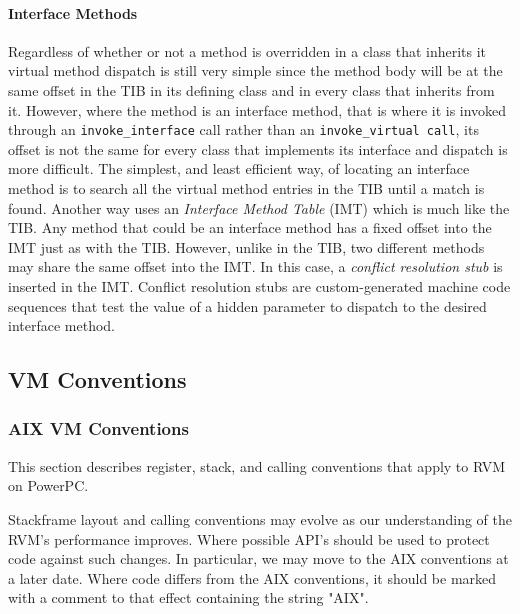 \paragraph{Interface Methods}
Regardless of whether or not a method is overridden in a class that inherits it
virtual method dispatch is still very simple since the method body will be at
the same offset in the TIB in its defining class and in every class that 
inherits from it. 
However, where the method is an interface method, 
that is where it is invoked through an {\tt invoke\_interface} call rather than
an {\tt invoke\_virtual call}, its offset is not the same for every class that 
implements its interface and dispatch is more difficult.
The simplest, and least efficient way, of locating an interface method 
is to search all the virtual method entries in the TIB until a match is found.
Another way uses an {\em Interface Method Table} (IMT) which is much like the 
TIB. Any method that could be an interface method has a fixed offset into the 
IMT just as with the TIB. However, unlike in the TIB, two different methods may
share the same offset into the IMT. In this case, a {\em conflict resolution
stub} is inserted in the IMT. Conflict resolution stubs are
custom-generated machine code sequences that test the value of a
hidden parameter to dispatch to the desired interface method.


\subsection{VM Conventions}
\subsubsection{AIX VM Conventions} \label{aix-conventions}

This section describes register, stack, and calling conventions that apply to 
RVM on PowerPC.

Stackframe layout and calling conventions may evolve as our understanding
of the RVM's performance improves.  Where possible API's should be used
to protect code against such changes.  In particular, we may move to
the AIX conventions at a later date.  Where code differs from the AIX
conventions, it should be marked with a comment to that effect containing
the string "AIX".


